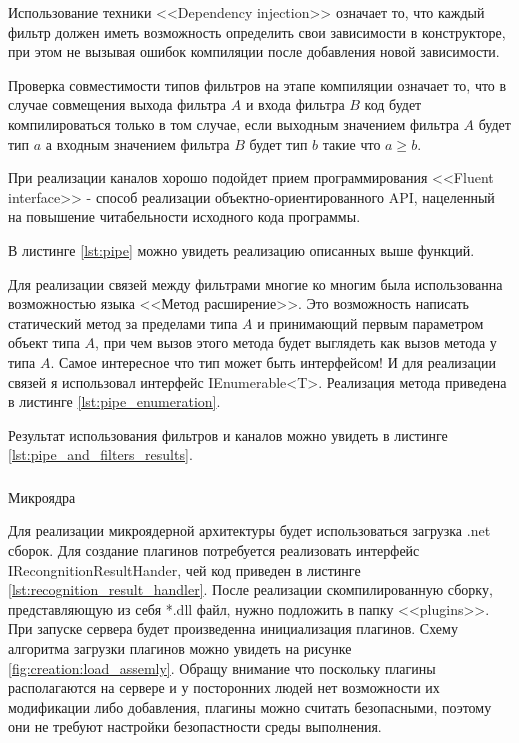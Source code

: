 Использование техники <<Dependency injection>> означает то, что каждый фильтр должен иметь возможность определить свои зависимости в конструкторе, при этом не вызывая ошибок компиляции после добавления новой зависимости.

Проверка совместимости типов фильтров на этапе компиляции означает то, что в случае совмещения выхода фильтра $A$ и входа фильтра $B$ код будет компилироваться только в том случае, если выходным значением фильтра $A$ будет тип $a$ а входным значением фильтра $B$ будет тип $b$ такие что $a \geq b$.

При реализации каналов хорошо подойдет прием программирования <<Fluent interface>> - способ реализации объектно-ориентированного API, нацеленный на повышение читабельности исходного кода программы.

В листинге \ref{lst:pipe} можно увидеть реализацию описанных выше функций.

Для реализации связей между фильтрами многие ко многим была использованна возможностью языка \csharp{} <<Метод расширение>>. Это возможность написать статический метод за пределами типа $A$ и принимающий первым параметром объект типа $A$, при чем вызов этого метода будет выглядеть как вызов метода у типа $A$. Самое интересное что тип может быть интерфейсом! И для реализации связей я использовал интерфейс IEnumerable<T>. Реализация метода приведена в листинге \ref{lst:pipe_enumeration}.

Результат использования фильтров и каналов можно увидеть в листинге \ref{lst:pipe_and_filters_results}.


\subsubsection{}
Микроядра

Для реализации микроядерной архитектуры будет использоваться загрузка .net сборок. Для создание плагинов потребуется реализовать интерфейс IRecongnitionResultHander, чей код приведен в листинге \ref{lst:recognition_result_handler}. После реализации скомпилированную сборку, представляющую из себя *.dll файл, нужно подложить в папку <<plugins>>. При запуске сервера будет произведенна инициализация плагинов. Схему алгоритма загрузки плагинов можно увидеть на рисунке \ref{fig:creation:load_assemly}. Обращу внимание что поскольку плагины располагаются на сервере и у посторонних людей нет возможности их модификации либо добавления, плагины можно считать безопасными, поэтому они не требуют настройки безопастности среды выполнения.

